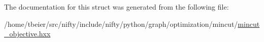The documentation for this struct was generated from the following file\+:\begin{DoxyCompactItemize}
\item 
/home/tbeier/src/nifty/include/nifty/python/graph/optimization/mincut/\hyperlink{python_2graph_2optimization_2mincut_2mincut__objective_8hxx}{mincut\+\_\+objective.\+hxx}\end{DoxyCompactItemize}
